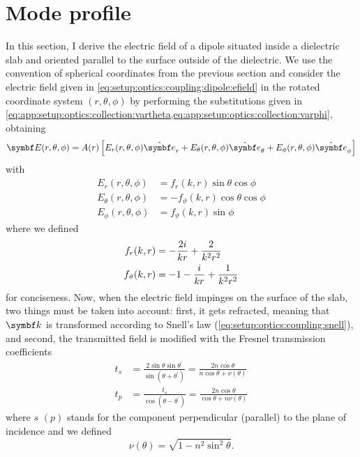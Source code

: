 \section{Mode profile}\label{sec:app:setup:optics:modes}
In this section, I derive the electric field of a dipole situated inside a dielectric slab and oriented parallel to the surface outside of the dielectric.
We use the convention of spherical coordinates from the previous section and consider the electric field given in \cref{eq:setup:optics:coupling:dipole:efield} in the rotated coordinate system $(r, \theta, \phi)$ by performing the substitutions given in \cref{eq:app:setup:optics:collection:vartheta,eq:app:setup:optics:collection:varphi}, obtaining
\begin{equation}
    \bvec{E}(r, \theta, \phi) = A(r)\left[E_r(r, \theta, \phi)\ubvec{r} + E_{\theta}(r, \theta, \phi)\ubvec{\theta} + E_{\phi}(r, \theta, \phi)\ubvec{\phi}\right]
\end{equation}
with
\begin{align}
    E_r(r, \theta, \phi) &= f_r(k, r)\sin\theta\cos\phi \\
    E_{\theta}(r, \theta, \phi) &= -f_{\vartheta}(k, r)\cos\theta\cos\phi \\
    E_{\phi}(r, \theta, \phi) &= f_{\vartheta}(k, r)\sin\phi
\end{align}
where we defined
\begin{align}
    f_r(k, r) &= -\frac{2i}{k r} + \frac{2}{k^2 r^2} \\
    f_{\vartheta}(k, r) &= -1 - \frac{i}{k r} + \frac{1}{k^2 r^2}
\end{align}
for conciseness.
Now, when the electric field impinges on the surface of the slab, two things must be taken into account: first, it gets refracted, meaning that $\bvec{k}$ is transformed according to Snell's law (\cref{eq:setup:optics:coupling:snell}), and second, the transmitted field is modified with the Fresnel transmission coefficients~\cite{Hecht2017}
\begin{align}
    t_s &= \frac{2\sin\theta\sin\theta^\prime}{\sin(\theta + \theta^\prime)} = \frac{2n\cos\theta}{n\cos\theta + \nu(\theta)} \\
    t_p &= \frac{t_s}{\cos(\theta - \theta^\prime)} = \frac{2n\cos\theta}{\cos\theta + n\nu(\theta)}
\end{align}
where $s$ $(p)$ stands for the component perpendicular (parallel) to the plane of incidence and we defined
\begin{equation}
    \nu(\theta) = \sqrt{1 - n^2\sin^2\theta}.
\end{equation}

